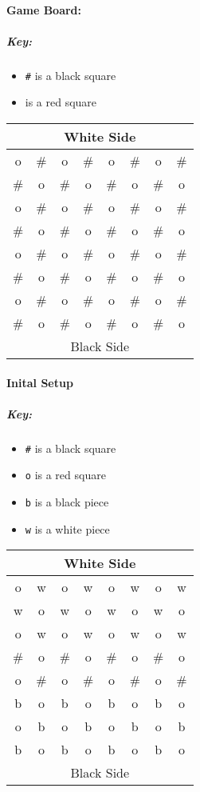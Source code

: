 \paragraph{Game Board:}
\subparagraph{Key:}{%
  \begin{itemize}
    \item \texttt{\#} is a black square
    \item {} is a red square
  \end{itemize}
}
\begin{tabular}{|c|c|c|c|c|c|c|c|}
  \hline
  \multicolumn{8}{|c|}{White Side}  \\ \hline
  o & \# & o & \# & o & \# & o & \# \\ \hline
  \# & o & \# & o & \# & o & \# & o \\ \hline
  o & \# & o & \# & o & \# & o & \# \\ \hline
  \# & o & \# & o & \# & o & \# & o \\ \hline
  o & \# & o & \# & o & \# & o & \# \\ \hline
  \# & o & \# & o & \# & o & \# & o \\ \hline
  o & \# & o & \# & o & \# & o & \# \\ \hline
  \# & o & \# & o & \# & o & \# & o \\ \hline
  \multicolumn{8}{|c|}{Black Side}  \\ \hline
\end{tabular}

\paragraph{Inital Setup}
\subparagraph{Key:}{%
  \begin{itemize}
    \item \texttt{\#} is a black square
    \item \texttt{o} is a red square
    \item \texttt{b} is a black piece
    \item \texttt{w} is a white piece
  \end{itemize}
}
\begin{tabular}{|c|c|c|c|c|c|c|c|}
  \hline
  \multicolumn{8}{|c|}{White Side}      \\ \hline
  o  & w  & o  & w  & o  & w  & o  & w  \\ \hline
  w  & o  & w  & o  & w  & o  & w  & o  \\ \hline
  o  & w  & o  & w  & o  & w  & o  & w  \\ \hline
  \# & o  & \# & o  & \# & o  & \# & o  \\ \hline
  o  & \# & o  & \# & o  & \# & o  & \# \\ \hline
  b  & o  & b  & o  & b  & o  & b  & o  \\ \hline
  o  & b  & o  & b  & o  & b  & o  & b  \\ \hline
  b  & o  & b  & o  & b  & o  & b  & o  \\ \hline
  \multicolumn{8}{|c|}{Black Side}      \\ \hline
\end{tabular}

